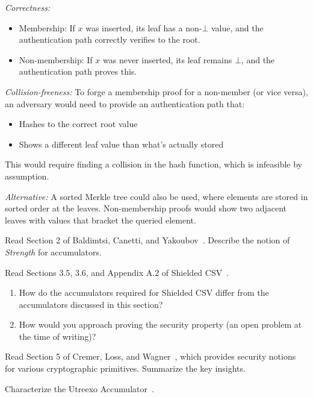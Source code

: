 \begin{mysolution}
  \emph{Correctness:} 
  \begin{itemize}
    \item Membership: If $x$ was inserted, its leaf has a non-$\bot$ value, and the authentication path correctly verifies to the root.
    \item Non-membership: If $x$ was never inserted, its leaf remains $\bot$, and the authentication path proves this.
  \end{itemize}
  
  \emph{Collision-freeness:} To forge a membership proof for a non-member (or vice versa), an adversary would need to provide an authentication path that:
  \begin{itemize}
    \item Hashes to the correct root value
    \item Shows a different leaf value than what's actually stored
  \end{itemize}
  This would require finding a collision in the hash function, which is infeasible by assumption.
  
  \emph{Alternative:} A sorted Merkle tree could also be used, where elements are stored in sorted order at the leaves.
  Non-membership proofs would show two adjacent leaves with values that bracket the queried element.
\end{mysolution}
\fi

\begin{exercise}[Optional]
  Read Section 2 of Baldimtsi, Canetti, and Yakoubov~\cite{RSA:BalCanYak20}.
  Describe the notion of \emph{Strength} for accumulators.
\end{exercise}

\begin{exercise}[Optional]
  Read Sections 3.5, 3.6, and Appendix A.2 of Shielded CSV~\cite{nick2025shielded}.
  \begin{enumerate}
    \item How do the accumulators required for Shielded CSV differ from the accumulators discussed in this section?
    \item How would you approach proving the  security property (an open problem at the time of writing)?
  \end{enumerate}
\end{exercise}

\begin{exercise}[Optional]
  Read Section 5 of Cremer, Loss, and Wagner~\cite{EC:CreLosWag24}, which provides security notions for various cryptographic primitives.
  Summarize the key insights.
\end{exercise}

\begin{exercise}[Optional]
  Characterize the Utreexo Accumulator~\cite{add:bip-utreexo}.
\end{exercise}


